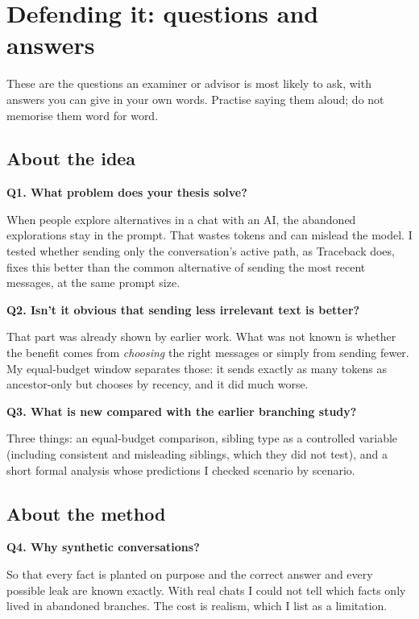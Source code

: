 \chapter{Defending it: questions and answers}

These are the questions an examiner or advisor is most likely to ask, with answers you can give in your own words. Practise saying them aloud; do not memorise them word for word.

\section*{About the idea}

\textbf{Q1. What problem does your thesis solve?}\par
When people explore alternatives in a chat with an AI, the abandoned explorations stay in the prompt. That wastes tokens and can mislead the model. I tested whether sending only the conversation's active path, as Traceback does, fixes this better than the common alternative of sending the most recent messages, at the same prompt size.

\textbf{Q2. Isn't it obvious that sending less irrelevant text is better?}\par
That part was already shown by earlier work. What was not known is whether the benefit comes from \emph{choosing} the right messages or simply from sending fewer. My equal-budget window separates those: it sends exactly as many tokens as ancestor-only but chooses by recency, and it did much worse.

\textbf{Q3. What is new compared with the earlier branching study?}\par
Three things: an equal-budget comparison, sibling type as a controlled variable (including consistent and misleading siblings, which they did not test), and a short formal analysis whose predictions I checked scenario by scenario.

\section*{About the method}

\textbf{Q4. Why synthetic conversations?}\par
So that every fact is planted on purpose and the correct answer and every possible leak are known exactly. With real chats I could not tell which facts only lived in abandoned branches. The cost is realism, which I list as a limitation.

